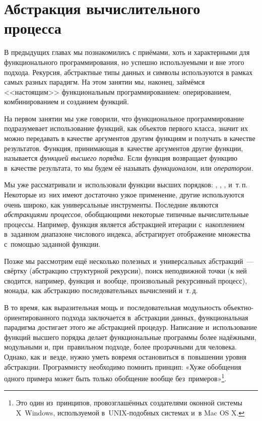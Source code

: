 \label{Less:high-order}

\section[4]{Абстракция вычислительного процесса}%
В предыдущих главах мы познакомились с приёмами, хоть и характерными для функционального программирования, но успешно используемыми и вне этого подхода. Рекурсия, абстрактные типы данных и символы используются в рамках самых разных парадигм. На этом занятии мы, наконец, займёмся <<настоящим>> функциональным программированием: оперированием, комбинированием и созданием функций. 

На первом занятии мы уже говорили, что функциональное программирование подразумевает использование функций, как объектов первого класса, значит их можно передавать в качестве аргументов другим функциям и получать в качестве результатов. Функция, принимающая в~качестве аргументов другие функции, называется \emph{функцией высшего порядка}. Если функция возвращает функцию в~качестве результата, то мы будем её называть \emph{функционалом}, или \emph{оператором.} 

Мы уже рассматривали и~использовали функции высших порядков: , , ,  и~т.\,п. Некоторые из~них имеют достаточно узкое применение, другие используются очень широко, как универсальные инструменты. Последние являются \emph{абстракциями процессов}, обобщающими некоторые типичные вычислительные процессы. Например, функция  является абстракцией итерации с~накоплением в~заданном диапазоне числового индекса,  абстрагирует отображение множества с~помощью заданной функции.

Позже мы рассмотрим ещё несколько полезных и~универсальных абстракций~--- свёртку (абстракцию структурной рекурсии), поиск неподвижной точки (к ней сводится, например, функция  и~вообще, произвольный рекурсивный процесс), монады, как абстракцию последовательных вычислений и~т.\,д.

В то время, как выразительная мощь и~последовательная модульность объектно-ориентированного подхода заключается в~абстракции данных, функциональная парадигма достигает этого же абстракцией процедур. Написание и~использование функций высшего порядка делает функциональные программы более надёжными, модульными и, при~правильном подходе, более прозрачными для человека. 
Однако, как и~везде, нужно уметь вовремя остановиться в~повышении уровня абстракции. Программисту необходимо помнить принцип: «Хуже обобщения одного примера может быть только обобщение вообще без~примеров»\footnote{Это один из~принципов, провозглашённых создателями оконной системы X~Windows, используемой в~UNIX-подобных системах и~в Mac OS X.}.

